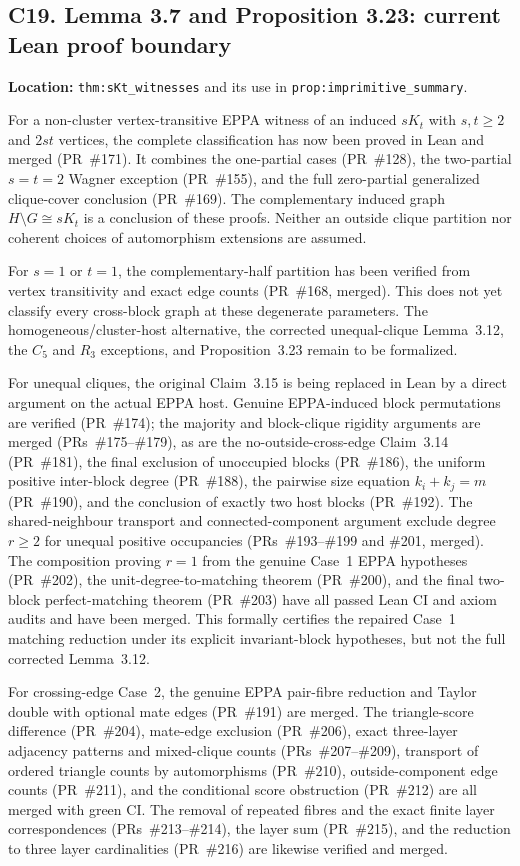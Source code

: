 \documentclass[11pt,a4paper]{article}
\begin{document}
\subsection*{C19. Lemma 3.7 and Proposition 3.23: current Lean proof boundary}
\textbf{Location:} \texttt{thm:sKt\_witnesses} and its use in
\texttt{prop:imprimitive\_summary}.

For a non-cluster vertex-transitive EPPA witness of an induced
\(sK_t\) with \(s,t\ge2\) and \(2st\) vertices, the complete
classification has now been proved in Lean and merged
(PR~\#171). It combines the one-partial cases (PR~\#128),
the two-partial \(s=t=2\) Wagner exception (PR~\#155), and
the full zero-partial generalized clique-cover conclusion
(PR~\#169). The complementary induced graph
\(H\setminus G\cong sK_t\) is a conclusion of these proofs.
Neither an outside clique partition nor coherent choices
of automorphism extensions are assumed.

For \(s=1\) or \(t=1\), the complementary-half partition
has been verified from vertex transitivity and exact edge
counts (PR~\#168, merged). This does not yet classify every
cross-block graph at these degenerate parameters. The
homogeneous/cluster-host alternative, the corrected
unequal-clique Lemma~3.12, the \(C_5\) and \(R_3\)
exceptions, and Proposition~3.23 remain to be formalized.

For unequal cliques, the original Claim~3.15 is being
replaced in Lean by a direct argument on the actual EPPA host.
Genuine EPPA-induced block permutations are verified (PR~\#174);
the majority and block-clique rigidity arguments are merged
(PRs~\#175--\#179), as are the no-outside-cross-edge Claim~3.14
(PR~\#181), the final exclusion of unoccupied blocks
(PR~\#186), the uniform positive inter-block degree (PR~\#188),
the pairwise size equation \(k_i+k_j=m\) (PR~\#190),
and the conclusion of exactly two host blocks (PR~\#192).
The shared-neighbour transport and connected-component argument
exclude degree \(r\ge2\) for unequal positive occupancies
(PRs~\#193--\#199 and \#201, merged).
The composition proving \(r=1\) from the genuine Case~1
EPPA hypotheses (PR~\#202), the unit-degree-to-matching
theorem (PR~\#200), and the final two-block
perfect-matching theorem (PR~\#203) have all passed
Lean CI and axiom audits and have been merged.
This formally certifies the repaired Case~1 matching
reduction under its explicit invariant-block hypotheses,
but not the full corrected Lemma~3.12.

For crossing-edge Case~2, the genuine EPPA pair-fibre
reduction and Taylor double with optional mate edges
(PR~\#191) are merged. The triangle-score difference
(PR~\#204), mate-edge exclusion (PR~\#206), exact
three-layer adjacency patterns and mixed-clique counts
(PRs~\#207--\#209), transport of ordered triangle
counts by automorphisms (PR~\#210), outside-component
edge counts (PR~\#211), and the conditional score
obstruction (PR~\#212) are all merged with green CI.
The removal of repeated fibres and the exact finite
layer correspondences (PRs~\#213--\#214), the layer
sum (PR~\#215), and the reduction to three layer
cardinalities (PR~\#216) are likewise verified and merged.
\end{document}
